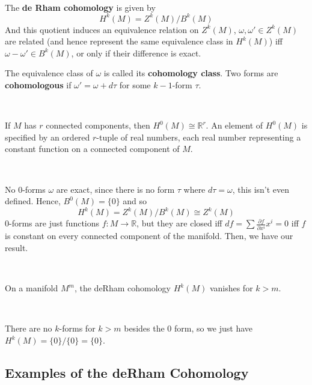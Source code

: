 \documentclass{article}
\begin{document}
\begin{definition}
  \

  The \textbf{de Rham cohomology} is given by $$H^k(M) = Z^k(M)/B^k(M)$$And this quotient induces an equivalence relation on $Z^k(M)$, $\omega, \omega' \in Z^k(M)$ are related (and hence represent the same equivalence class in $H^k(M)$) iff $\omega - \omega' \in B^k(M)$, or only if their difference is exact.

  The equivalence class of $\omega$ is called its \textbf{cohomology class}. Two forms are \textbf{cohomologous} if $\omega' = \omega + d\tau$ for some $k-1$-form $\tau$.
\end{definition}

\begin{theorem}
  \

  If $M$ has $r$ connected components, then $H^0(M) \cong \mathbb{R}^r$. An element of $H^0(M)$ is specified by an ordered $r$-tuple of real numbers, each real number representing a constant function on a connected component of $M$.
\end{theorem}

\begin{customproof}
  \

  No $0$-forms $\omega$ are exact, since there is no form $\tau$ where $d\tau = \omega$, this isn't even defined. Hence, $B^0(M) = \{0\}$ and so $$H^k(M) = Z^k(M)/B^k(M) \cong Z^k(M)$$$0$-forms are just functions $f: M \to \mathbb{R}$, but they are closed iff $df = \sum \frac{\partial f}{\partial x^i} x^i = 0$ iff $f$ is constant on every connected component of the manifold. Then, we have our result.
\end{customproof}

\begin{proposition}
  \

  On a manifold $M^m$, the deRham cohomology $H^k(M)$ vanishes for $k > m$.
\end{proposition}

\begin{customproof}
  \

  There are no $k$-forms for $k>m$ besides the $0$ form, so we just have $H^k(M) = \{0\}/\{0\} = \{0\}$.
\end{customproof}

\subsection{Examples of the deRham Cohomology}
\
\end{document}
